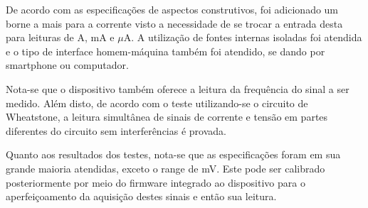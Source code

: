 De acordo com as especificações de aspectos construtivos, foi adicionado um borne a mais para a corrente visto a necessidade de se trocar a entrada desta para leituras de A, mA e $\mu$A. A utilização de fontes internas isoladas foi atendida e o tipo de interface homem-máquina também foi atendido, se dando por smartphone ou computador.

Nota-se que o dispositivo também oferece a leitura da frequência do sinal a ser medido. Além disto, de acordo com o teste utilizando-se o circuito de Wheatstone, a leitura simultânea de sinais de corrente e tensão em partes diferentes do circuito sem interferências é provada.

Quanto aos resultados dos testes, nota-se que as especificações foram em sua grande maioria atendidas, exceto o range de mV. Este pode ser calibrado posteriormente por meio do firmware integrado ao dispositivo para o aperfeiçoamento da aquisição destes sinais e então sua leitura.
